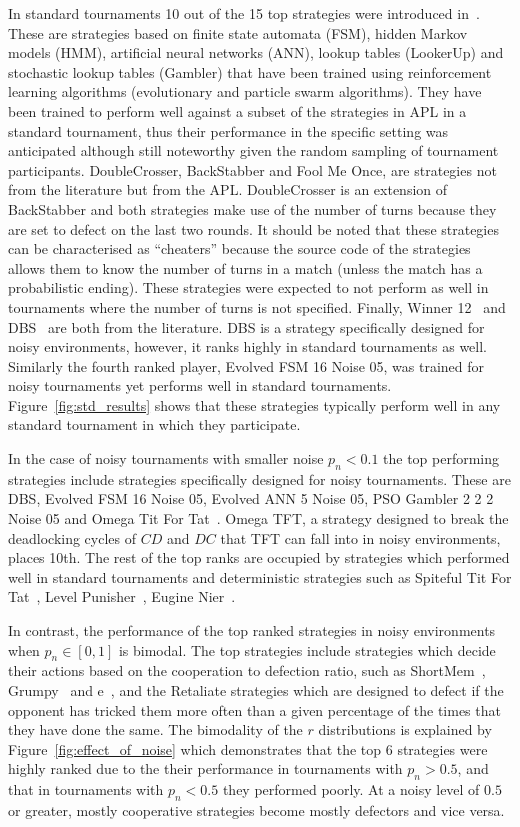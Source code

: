 In standard tournaments 10 out of the 15 top strategies were introduced
in~\cite{Harper2017}. These are strategies based on finite state automata (FSM),
hidden Markov models (HMM), artificial neural networks (ANN), lookup tables
(LookerUp) and stochastic lookup tables (Gambler) that have been trained using
reinforcement learning algorithms (evolutionary and particle swarm algorithms).
They have been trained to perform well against a subset of the strategies
in APL in a standard tournament, thus their performance in the
specific setting was anticipated although still noteworthy given the random
sampling of tournament participants. DoubleCrosser, BackStabber and Fool Me Once, are
strategies not from the literature but from the APL. DoubleCrosser is an extension
of BackStabber and both strategies make use of the number of turns because they are
set to defect on the last two rounds. It should be noted that these
strategies can be characterised as ``cheaters'' because the source code of the strategies
allows them to know the number of turns in a match (unless the match has a probabilistic ending). These strategies were expected to not perform as well in
tournaments where the number of turns is not specified. Finally, Winner
12~\cite{mathieu2017} and DBS~\cite{Au2006} are both from the literature.
DBS is a strategy specifically designed for noisy environments, however, it ranks
highly in standard tournaments as well. Similarly the fourth ranked player,
Evolved FSM 16 Noise 05, was
trained for noisy tournaments yet performs well in standard tournaments.
Figure~\ref{fig:std_results} shows that these strategies typically perform
well in any standard tournament in which they participate.

In the case of noisy tournaments with smaller noise \(p_n < 0.1\) the top
performing strategies
include strategies specifically designed for noisy tournaments. These are DBS,
Evolved FSM 16 Noise 05, Evolved ANN 5 Noise 05, PSO Gambler 2 2 2 Noise 05 and
Omega Tit For Tat~\cite{kendall2007iterated}. Omega TFT, a strategy designed
to break the deadlocking cycles of \(CD\) and \(DC\) that TFT can fall into in noisy
environments, places 10th. The rest of the top ranks are
occupied by strategies which performed well in standard tournaments and
deterministic strategies such as Spiteful Tit For Tat~\cite{prison}, Level
Punisher~\cite{Eckhart2015}, Eugine Nier~\cite{lesswrong}.

In contrast, the performance of the top ranked strategies in noisy environments
when \(p_n\in [0, 1]\) is bimodal. The top strategies include strategies which
decide their actions based on the cooperation to defection ratio, such as
ShortMem~\cite{Andre2013}, Grumpy~\cite{axelrodproject} and
e~\cite{axelrodproject}, and the Retaliate strategies which are designed to
defect if the opponent has tricked them more often than a given percentage of the times that
they have done the same. The bimodality of the \(r\) distributions is explained
by Figure~\ref{fig:effect_of_noise} which demonstrates that the top 6 strategies
were highly ranked due to the their performance in tournaments with \(p_n>0.5\),
and that in tournaments with \(p_n<0.5\) they
performed poorly. At a noisy level of \(0.5\) or greater, mostly cooperative strategies
become mostly defectors and vice versa.

